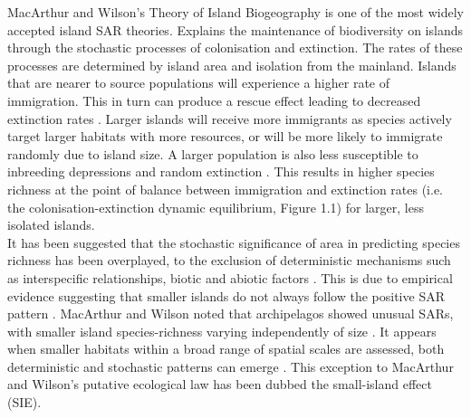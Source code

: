 \noindent MacArthur and Wilson's Theory of Island Biogeography \cite{MacArthurRobertH1967Ttoi} is one of the most widely accepted island SAR theories. Explains the maintenance of biodiversity on islands through the stochastic processes of colonisation and extinction. The rates of these processes are determined by island area and isolation from the mainland. Islands that are nearer to source populations will experience a higher rate of immigration. This in turn can produce a rescue effect leading to decreased extinction rates \cite{brown1977turnover}. Larger islands will receive more immigrants as species actively target larger habitats with more resources, or will be more likely to immigrate randomly due to island size. A larger population is also less susceptible to inbreeding depressions and random extinction \cite{macdonald2018theory}. This results in higher species richness at the point of balance between immigration and extinction rates (i.e. the colonisation-extinction dynamic equilibrium, Figure 1.1) for larger, less isolated islands. \\

\noindent It has been suggested that the stochastic significance of area in predicting species richness has been overplayed, to the exclusion of deterministic mechanisms such as interspecific relationships, biotic and abiotic factors \cite{abbott1974numbers}. This is due to empirical evidence suggesting that smaller islands do not always follow the positive SAR pattern  \cite{triantis2006re} \cite{sfenthourakis2009habitat}. MacArthur and Wilson noted that archipelagos showed unusual SARs, with smaller island species-richness varying independently of size \cite{MacArthurRobertH1967Ttoi}. It appears when smaller habitats within a broad range of spatial scales are assessed, both deterministic and stochastic patterns can emerge \cite{lomolino2001towards}. This exception to MacArthur and Wilson's putative ecological law has been dubbed the small-island effect (SIE). \\

